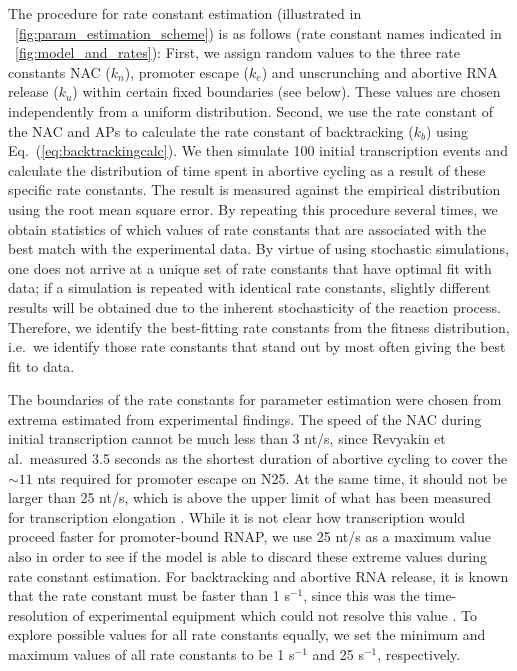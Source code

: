 The procedure for rate constant estimation (illustrated in
\FIG~\ref{fig:param_estimation_scheme}) is as follows (rate constant names
indicated in \FIG~\ref{fig:model_and_rates}): First, we assign random values
to the three rate constants NAC ($k_n$), promoter escape ($k_e$) and
unscrunching and abortive RNA release ($k_u$) within certain fixed boundaries
(see below). These values are chosen independently from a uniform
distribution. Second, we use the rate constant of the NAC and APs to
calculate the rate constant of backtracking ($k_b$) using
Eq.~(\ref{eq:backtrackingcalc}). We then simulate 100 initial transcription
events and calculate the distribution of time spent in abortive cycling as a
result of these specific rate constants. The result is measured against the
empirical distribution \cite{revyakin_abortive_2006} using the root mean
square error. By repeating this procedure several times, we obtain statistics
of which values of rate constants that are associated with the best match with
the experimental data. By virtue of using stochastic simulations, one does not
arrive at a unique set of rate constants that have optimal fit with data; if a
simulation is repeated with identical rate constants, slightly different
results will be obtained due to the inherent stochasticity of the reaction
process. Therefore, we identify the best-fitting rate constants from the
fitness distribution, i.e.\ we identify those rate constants that stand out
by most often giving the best fit to data.

The boundaries of the rate constants for parameter estimation were chosen from
extrema estimated from experimental findings. The speed of the NAC during initial
transcription cannot be much less than 3 nt/s, since Revyakin et al.\ measured
3.5 seconds as the shortest duration of abortive cycling
\cite{revyakin_abortive_2006} to cover the $\sim 11$ nts required for promoter
escape on N25. At the same time, it should not be larger than 25 nt/s,
which is above the upper limit of what has been measured for transcription
elongation \cite{bai_mechanochemical_2007}. While it is not clear how
transcription would proceed faster for promoter-bound RNAP, we use 25 nt/s as
a maximum value also in order to see if the model is able to discard these
extreme values during rate constant estimation. For backtracking and abortive
RNA release, it is known that the rate constant must be faster than 1
s$^{-1}$, since this was the time-resolution of experimental equipment which
could not resolve this value \cite{revyakin_abortive_2006}. To explore
possible values for all rate constants equally, we set the minimum and maximum
values of all rate constants to be 1 s$^{-1}$ and 25 s$^{-1}$, respectively. 

